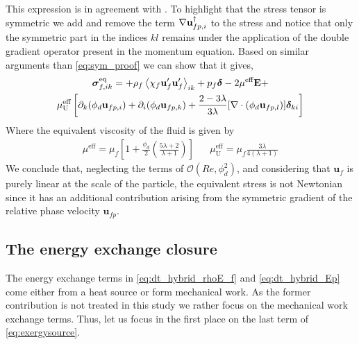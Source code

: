 This expression is in agreement with \citet[Appendix A]{zhang1997momentum}. 
To highlight that the stress tensor is symmetric we add and remove the term $ \mathbf{\nabla} \textbf{u}_{fp,i}^\dagger$  to the stress and notice that only the symmetric part in the indices $kl$ remains under the application of the double gradient operator present in the momentum equation. 
Based on similar arguments than \ref{eq:sym_proof} we can show that it gives, 
\begin{multline}
    \bm{\sigma}^\text{eq}_{f,ik} =
    + \rho_f\avg{\chi_f\textbf{u}_f'\textbf{u}_f'}_{ik} 
    + p_f \bm\delta
    - 2\mu^\text{eff} \textbf{E}
    + \\
    \mu_\text{U}^\text{eff}
    \left[
        \partial_k   (\phi_d\textbf{u}_{fp,i})
        + \partial_i (\phi_d\textbf{u}_{fp,k})
        + \frac{2-3\lambda}{3\lambda}  [\div (\phi_d\textbf{u}_{fp,l})]\bm\delta_{ki}
    \right]
    \label{eq:fluid_phase_stress}
\end{multline} 
Where the equivalent viscosity of the fluid is given by 
\begin{align*}
    \mu^\text{eff} = \mu_f \left[
        1
        +\frac{\phi_d}{2}\left(
            \frac{5\lambda +2}{\lambda +1}
        \right)
    \right] &&
    \mu^\text{eff}_\text{U}
    = \mu_f\frac{ 3\lambda}{4(\lambda +1) }
\end{align*}
We conclude that, neglecting the terms of $\mathcal{O}(Re,\phi^2_d)$, and considering that $\textbf{u}_f$ is purely linear at the scale of the particle, the equivalent stress is not Newtonian since it has an additional contribution arising from the symmetric gradient of the relative phase velocity $\textbf{u}_{fp}$. 


\subsection{The energy exchange closure}

The energy exchange terms in \ref{eq:dt_hybrid_rhoE_f} and \ref{eq:dt_hybrid_Ep} come either from a heat source or form mechanical work. 
As the former contribution is not treated in this study we rather focus on the mechanical work exchange terms. 
Thus, let us focus in the first place on the last term of \ref{eq:exergysource}.

